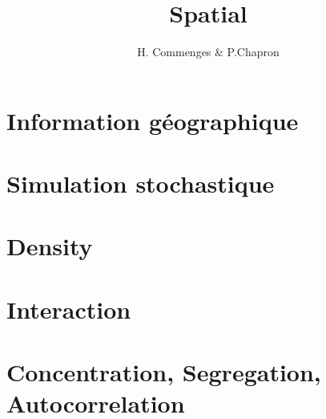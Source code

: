 \documentclass{beamer}
\author{H. Commenges & P.Chapron}
\title{Spatial}
\date{}
\begin{document}
\section{Information géographique}

  
  
  
  
\section{Simulation stochastique}

  
  
\section{Density}

 

\section{Interaction}

  



\section{Concentration, Segregation, Autocorrelation}
  

\end{document}
